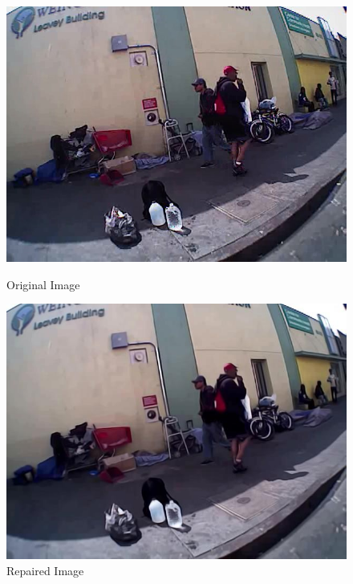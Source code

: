\documentclass[a4paper]{article}
\begin{document}
\begin{figure}[H]
\begin{minipage}[b]{0.12\textwidth}
 \includegraphics[trim=13.5cm 5cm 5.5cm 3cm, clip, width=\textwidth]{00253_112.jpg}
 \caption{Original Image}
 \end{minipage}
  \begin{minipage}[b]{0.12\textwidth}
    \includegraphics[trim=13.5cm 5cm 5.5cm 3cm, clip, width=\textwidth]{00253_112R.jpg}
    \caption{Repaired Image}
  \end{minipage}
  \hfill
  \begin{minipage}[b]{0.12\textwidth}

\end{minipage}
\end{figure}
\end{document}
